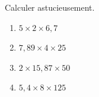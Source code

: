 \documentclass[exercice]{thedocument}%
\begin{document}
%
Calculer astucieusement.
\begin{enumerate}
    \item $5\times2\times6,7$
    \item $7,89\times4\times25$
    \item $2\times15,87\times50$
    \item $5,4\times8\times125$
\end{enumerate}
\end{document}
